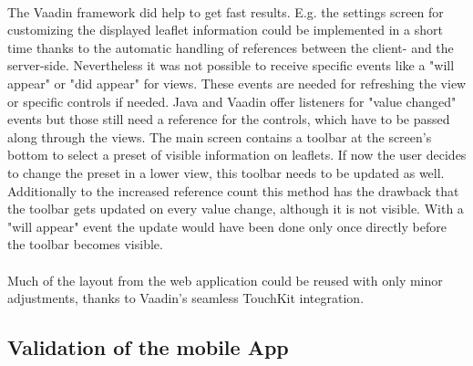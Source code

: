 \\
The Vaadin framework did help to get fast results. E.g. the settings screen for customizing the displayed leaflet information could be implemented in a short time thanks to the automatic handling of references between the client- and the server-side. Nevertheless it was not possible to receive specific events like a "will appear" or "did appear" for views. These events are needed for refreshing the view or specific controls if needed. Java and Vaadin offer listeners for "value changed" events but those still need a reference for the controls, which have to be passed along through the views. The main screen contains a toolbar at the screen's bottom to select a preset of visible information on leaflets. If now the user decides to change the preset in a lower view, this toolbar needs to be updated as well. Additionally to the increased reference count this method has the drawback that the toolbar gets updated on every value change, although it is not visible. With a "will appear" event the update would have been done only once directly before the toolbar becomes visible.
\\
\\
Much of the layout from the web application could be reused with only minor adjustments, thanks to Vaadin's seamless TouchKit integration. 

\subsection{Validation of the mobile App}
\label{subsec:Validation}
